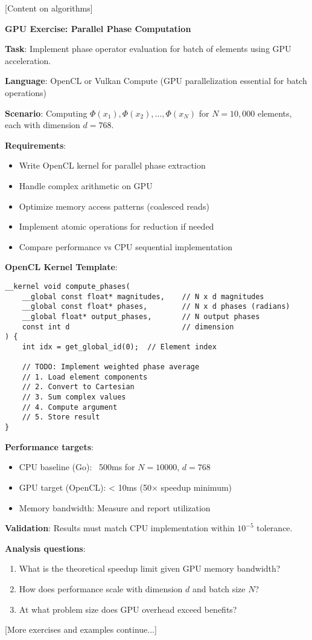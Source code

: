 [Content on algorithms]

\begin{coding}
\textbf{GPU Exercise: Parallel Phase Computation}

\textbf{Task}: Implement phase operator evaluation for batch of elements using GPU acceleration.

\textbf{Language}: OpenCL or Vulkan Compute (GPU parallelization essential for batch operations)

\textbf{Scenario}: Computing $\Phi(x_1), \Phi(x_2), \ldots, \Phi(x_N)$ for $N=10,000$ elements, each with dimension $d=768$.

\textbf{Requirements}:
\begin{itemize}
\item Write OpenCL kernel for parallel phase extraction
\item Handle complex arithmetic on GPU
\item Optimize memory access patterns (coalesced reads)
\item Implement atomic operations for reduction if needed
\item Compare performance vs CPU sequential implementation
\end{itemize}

\textbf{OpenCL Kernel Template}:
\begin{lstlisting}[style=opencl]
__kernel void compute_phases(
    __global const float* magnitudes,    // N x d magnitudes
    __global const float* phases,        // N x d phases (radians)
    __global float* output_phases,       // N output phases
    const int d                          // dimension
) {
    int idx = get_global_id(0);  // Element index
    
    // TODO: Implement weighted phase average
    // 1. Load element components
    // 2. Convert to Cartesian
    // 3. Sum complex values
    // 4. Compute argument
    // 5. Store result
}
\end{lstlisting}

\textbf{Performance targets}:
\begin{itemize}
\item CPU baseline (Go): ~500ms for $N=10000$, $d=768$
\item GPU target (OpenCL): < 10ms (50× speedup minimum)
\item Memory bandwidth: Measure and report utilization
\end{itemize}

\textbf{Validation}: Results must match CPU implementation within $10^{-5}$ tolerance.

\textbf{Analysis questions}:
\begin{enumerate}
\item What is the theoretical speedup limit given GPU memory bandwidth?
\item How does performance scale with dimension $d$ and batch size $N$?
\item At what problem size does GPU overhead exceed benefits?
\end{enumerate}
\end{coding}

[More exercises and examples continue...]

